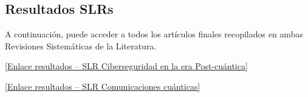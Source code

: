\chapter{\appendixname}

\section{Resultados SLRs}

A continuación, puede acceder a todos los artículos finales recopilados en
ambas Revisiones Sistemáticas de la Literatura.
\vspace{1em} 
\par \href{https://docs.google.com/spreadsheets/d/1Ja7HE417MB9E6_DEKpWxU8IcA9FSfR-O/edit?usp=sharing&ouid=110188359051946903648&rtpof=true&sd=true}{[Enlace resultados – SLR Ciberseguridad en la era Post-cuántica]}
\par \href{https://docs.google.com/spreadsheets/d/1NNDWcegwtOo9s3O_Sox1QIJSZKyfO-ad/edit?usp=sharing&ouid=110188359051946903648&rtpof=true&sd=true}{[Enlace resultados – SLR Comunicaciones cuánticas]}

